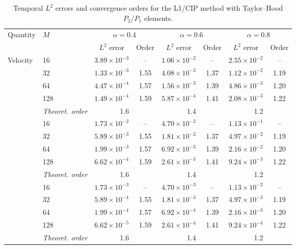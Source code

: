 \documentclass[11pt,a4paper]{article}
\numberwithin{equation}{section}
\renewcommand{\arraystretch}{1.25}
\theoremstyle{plain}
\theoremstyle{definition}
\theoremstyle{remark}
\begin{document}
\begin{table}[htbp]
\centering
\caption{Temporal $L^2$ errors and convergence orders for the L1/CIP
method with Taylor--Hood $P_2/P_1$ elements.}
\label{tab:ex1-time-cip}
\setlength{\tabcolsep}{6pt}
\renewcommand{\arraystretch}{1.15}
\begin{tabular}{llcc|cc|cc}
\toprule
\multirow{2}{*}{Quantity} & \multirow{2}{*}{$M$}
& \multicolumn{2}{c|}{$\alpha=0.4$}
& \multicolumn{2}{c|}{$\alpha=0.6$}
& \multicolumn{2}{c}{$\alpha=0.8$} \\
\cmidrule(lr){3-4}
\cmidrule(lr){5-6}
\cmidrule(l){7-8}
& & $L^2$ error & Order
  & $L^2$ error & Order
  & $L^2$ error & Order \\
\midrule

\multirow{5}{*}{Velocity}
& 16  & $3.89\times10^{-3}$ & --   & $1.06\times10^{-2}$ & --   & $2.55\times10^{-2}$ & --   \\
& 32  & $1.33\times10^{-3}$ & 1.55 & $4.08\times10^{-3}$ & 1.37 & $1.12\times10^{-2}$ & 1.19 \\
& 64  & $4.47\times10^{-4}$ & 1.57 & $1.56\times10^{-3}$ & 1.39 & $4.86\times10^{-3}$ & 1.20 \\
& 128 & $1.49\times10^{-4}$ & 1.59 & $5.87\times10^{-4}$ & 1.41 & $2.08\times10^{-3}$ & 1.22 \\
& \textit{Theoret. order}
& \multicolumn{2}{c|}{1.6}
& \multicolumn{2}{c|}{1.4}
& \multicolumn{2}{c}{1.2} \\

\addlinespace
\multirow{5}{*}{Stress}
& 16  & $1.73\times10^{-2}$ & --   & $4.70\times10^{-2}$ & --   & $1.13\times10^{-1}$ & --   \\
& 32  & $5.89\times10^{-3}$ & 1.55 & $1.81\times10^{-2}$ & 1.37 & $4.97\times10^{-2}$ & 1.19 \\
& 64  & $1.99\times10^{-3}$ & 1.57 & $6.92\times10^{-3}$ & 1.39 & $2.16\times10^{-2}$ & 1.20 \\
& 128 & $6.62\times10^{-4}$ & 1.59 & $2.61\times10^{-3}$ & 1.41 & $9.24\times10^{-3}$ & 1.22 \\
& \textit{Theoret. order}
& \multicolumn{2}{c|}{1.6}
& \multicolumn{2}{c|}{1.4}
& \multicolumn{2}{c}{1.2} \\

\addlinespace
\multirow{5}{*}{Energy norm}
& 16  & $1.73\times10^{-3}$ & --   & $4.70\times10^{-3}$ & --   & $1.13\times10^{-2}$ & --   \\
& 32  & $5.89\times10^{-4}$ & 1.55 & $1.81\times10^{-3}$ & 1.37 & $4.97\times10^{-3}$ & 1.19 \\
& 64  & $1.99\times10^{-4}$ & 1.57 & $6.92\times10^{-4}$ & 1.39 & $2.16\times10^{-3}$ & 1.20 \\
& 128 & $6.62\times10^{-5}$ & 1.59 & $2.61\times10^{-4}$ & 1.41 & $9.24\times10^{-4}$ & 1.22 \\
& \textit{Theoret. order}
& \multicolumn{2}{c|}{1.6}
& \multicolumn{2}{c|}{1.4}
& \multicolumn{2}{c}{1.2} \\


\end{tabular}
\end{table}
\end{document}
